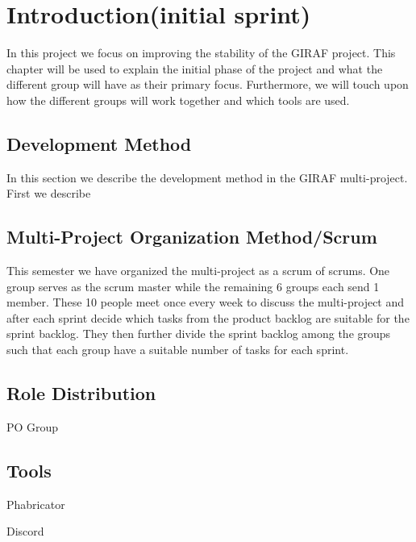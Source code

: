 \chapter{Introduction(initial sprint)}

In this project we focus on improving the stability of the GIRAF project. This
chapter will be used to explain the initial phase of the project and what the
different group will have as their primary focus. Furthermore, we will touch
upon how the different groups will work together and which tools are used.


\section{Development Method}
In this section we describe the development method in the GIRAF multi-project.
First we describe 





\section{Multi-Project Organization Method/Scrum}
 This semester we have organized the multi-project as a scrum of
scrums. One group serves as the scrum master while the remaining 6 groups each send 1
member. These 10 people meet once every week to discuss the multi-project
and after each sprint decide which tasks from the product backlog are suitable
for the sprint backlog. They then further divide the sprint backlog among the
groups such that each group have a suitable number of tasks for each sprint.\nl


\section{Role Distribution}

PO Group



\section{Tools}

Phabricator

Discord

